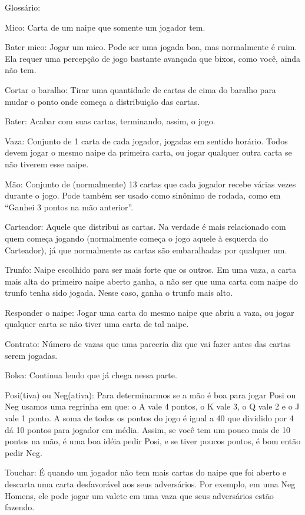 \begin{subsecao}{Glossário:}

Mico: Carta de um naipe que somente um jogador tem.

Bater mico: Jogar um mico. Pode ser uma jogada boa, mas normalmente é
ruim. Ela requer uma percepção de jogo bastante avançada que bixos,
como você, ainda não tem.

Cortar o baralho: Tirar uma quantidade de cartas de cima do baralho para mudar
o ponto onde começa a distribuição das cartas.

Bater: Acabar com suas cartas, terminando, assim, o jogo.

Vaza: Conjunto de 1 carta de cada jogador, jogadas em sentido horário. Todos
devem jogar o mesmo naipe da primeira carta, ou jogar qualquer outra carta se
não tiverem esse naipe.

Mão: Conjunto de (normalmente) 13 cartas que cada jogador recebe várias vezes
durante o jogo. Pode também ser usado como sinônimo de rodada, como
em ``Ganhei 3 pontos na mão anterior''.

Carteador: Aquele que distribui as cartas. Na verdade é mais relacionado com
quem começa jogando (normalmente começa o jogo aquele à esquerda do Carteador),
já que normalmente as cartas são embaralhadas por qualquer um.

Trunfo: Naipe escolhido para ser mais forte que os outros. Em uma vaza, a carta
mais alta do primeiro naipe aberto ganha, a não ser que uma carta com naipe do
trunfo tenha sido jogada. Nesse caso, ganha o trunfo mais alto.

Responder o naipe: Jogar uma carta do mesmo naipe que abriu a vaza, ou jogar
qualquer carta se não tiver uma carta de tal naipe.

Contrato: Número de vazas que uma parceria diz que vai fazer antes das cartas
serem jogadas.

Bolsa: Continua lendo que já chega nessa parte.

Posi(tiva) ou Neg(ativa): Para determinarmos se a mão é boa para jogar Posi ou
Neg usamos uma regrinha em que: o A vale 4 pontos, o K vale 3, o Q vale 2 e o J
vale 1 ponto. A soma de todos os pontos do jogo é igual a 40 que dividido por 4
dá 10 pontos para jogador em média. Assim, se você tem um pouco mais de 10
pontos na mão, é uma boa idéia pedir Posi, e se tiver poucos pontos, é bom
então pedir Neg.

Touchar: É quando um jogador não tem mais cartas do naipe que foi aberto e
descarta uma carta desfavorável aos seus adversários. Por exemplo, em uma Neg
Homens, ele pode jogar um valete em uma vaza que seus adversários estão fazendo.


\end{subsecao}

